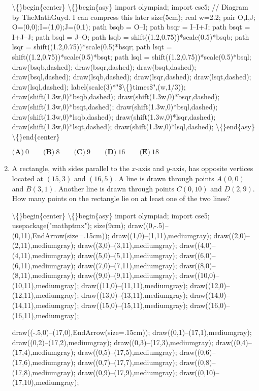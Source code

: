 \documentclass{article}
\begin{document}
\begin{enumerate}[label=\arabic*., itemsep=0.5em]
\textbackslash\{\}begin\{center\}
\textbackslash\{\}begin\{asy\}
import olympiad;
import cse5;
// Diagram by TheMathGuyd. I can compress this later
size(5cm);
real w=2.2;
pair O,I,J;
O=(0,0);I=(1,0);J=(0,1);
path bsqb = O--I;
path bsqr = I--I+J;
path bsqt = I+J--J;
path bsql = J--O;
path lsqb = shift((1.2,0.75))*scale(0.5)*bsqb;
path lsqr = shift((1.2,0.75))*scale(0.5)*bsqr;
path lsqt = shift((1.2,0.75))*scale(0.5)*bsqt;
path lsql = shift((1.2,0.75))*scale(0.5)*bsql;
draw(bsqb,dashed);
draw(bsqr,dashed);
draw(bsqt,dashed);
draw(bsql,dashed);
draw(lsqb,dashed);
draw(lsqr,dashed);
draw(lsqt,dashed);
draw(lsql,dashed);
label(scale(3)*"\$\textbackslash\{\}times\$",(w,1/3));
draw(shift(1.3w,0)*bsqb,dashed);
draw(shift(1.3w,0)*bsqr,dashed);
draw(shift(1.3w,0)*bsqt,dashed);
draw(shift(1.3w,0)*bsql,dashed);
draw(shift(1.3w,0)*lsqb,dashed);
draw(shift(1.3w,0)*lsqr,dashed);
draw(shift(1.3w,0)*lsqt,dashed);
draw(shift(1.3w,0)*lsql,dashed);
\textbackslash\{\}end\{asy\}
\textbackslash\{\}end\{center\}


\(\textbf{(A)}\ 0 \qquad \textbf{(B)}\ 8 \qquad \textbf{(C)}\ 9 \qquad \textbf{(D)}\ 16 \qquad \textbf{(E)}\ 18\)\par \vspace{0.5em}\item A rectangle, with sides parallel to the \(x\)-axis and \(y\)-axis, has opposite vertices located at \((15, 3)\) and \((16, 5)\). A line is drawn through points \(A(0, 0)\) and \(B(3, 1)\). Another line is drawn through points \(C(0, 10)\) and \(D(2, 9)\). How many points on the rectangle lie on at least one of the two lines?

\textbackslash\{\}begin\{center\}
\textbackslash\{\}begin\{asy\}
import olympiad;
import cse5;
usepackage("mathptmx");
size(9cm);
draw((0,-.5)--(0,11),EndArrow(size=.15cm));
draw((1,0)--(1,11),mediumgray);
draw((2,0)--(2,11),mediumgray);
draw((3,0)--(3,11),mediumgray);
draw((4,0)--(4,11),mediumgray);
draw((5,0)--(5,11),mediumgray);
draw((6,0)--(6,11),mediumgray);
draw((7,0)--(7,11),mediumgray);
draw((8,0)--(8,11),mediumgray);
draw((9,0)--(9,11),mediumgray);
draw((10,0)--(10,11),mediumgray);
draw((11,0)--(11,11),mediumgray);
draw((12,0)--(12,11),mediumgray);
draw((13,0)--(13,11),mediumgray);
draw((14,0)--(14,11),mediumgray);
draw((15,0)--(15,11),mediumgray);
draw((16,0)--(16,11),mediumgray);

draw((-.5,0)--(17,0),EndArrow(size=.15cm));
draw((0,1)--(17,1),mediumgray);
draw((0,2)--(17,2),mediumgray);
draw((0,3)--(17,3),mediumgray);
draw((0,4)--(17,4),mediumgray);
draw((0,5)--(17,5),mediumgray);
draw((0,6)--(17,6),mediumgray);
draw((0,7)--(17,7),mediumgray);
draw((0,8)--(17,8),mediumgray);
draw((0,9)--(17,9),mediumgray);
draw((0,10)--(17,10),mediumgray);


\end{enumerate}
\end{document}
